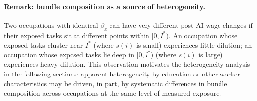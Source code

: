 \documentclass[11pt]{article}
\theoremstyle{plain}
\theoremstyle{remark}
\begin{document}
\paragraph{Remark: bundle composition as a source of heterogeneity.}
Two occupations with identical $\beta_x$ can have very different
post-AI wage changes if their exposed tasks sit at different points
within $[0, I^*)$.  An occupation whose exposed tasks cluster near
$I^*$ (where $s(i)$ is small) experiences little dilution; an
occupation whose exposed tasks lie deep in $[0, I^*)$ (where $s(i)$ is
large) experiences heavy dilution.  This observation motivates the
heterogeneity analysis in the following sections: apparent
heterogeneity by education or other worker characteristics may be
driven, in part, by systematic differences in bundle composition
across occupations at the same level of measured exposure.
\end{document}
